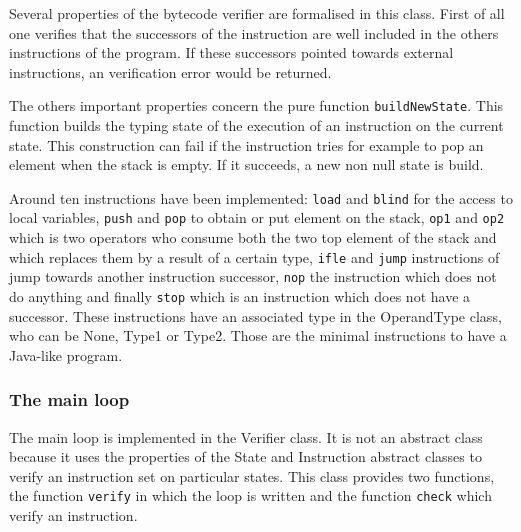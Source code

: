 Several properties of the bytecode verifier are formalised in this class.
First of all one verifies that the successors of the instruction are well included in the others instructions of the program. 
If these successors pointed towards external instructions, an verification error would be returned. 

The others important properties concern the pure function {\tt buildNewState}.
This function builds the typing state of the execution of an instruction  on the current state.
This construction can fail if the instruction tries for example to pop an element when the stack is empty.
If it succeeds, a new non null state is build.

Around ten instructions have been implemented:  {\tt load} and {\tt blind} for the access to local variables, {\tt push} and {\tt pop}   to obtain or put element on the stack, {\tt op1} and {\tt op2} which is two operators who consume both the two top element of the stack and which replaces them by a result of a certain type, {\tt ifle} and {\tt jump} instructions of jump towards another instruction successor, {\tt nop}  the instruction which does not do anything   and finally {\tt stop} which is an instruction which does not have a successor.
These instructions have an associated type in the OperandType class,
who can be None, Type1 or Type2.  Those are the minimal instructions to have a Java-like program.  
\subsubsection {The main loop}
The main loop is implemented in the Verifier class.
It is not an abstract class because it uses the properties of the State and Instruction abstract classes  to verify an instruction set on particular states.
This class provides two functions, the function  {\tt verify} in which the loop is written and the function {\tt check} which verify an instruction.


